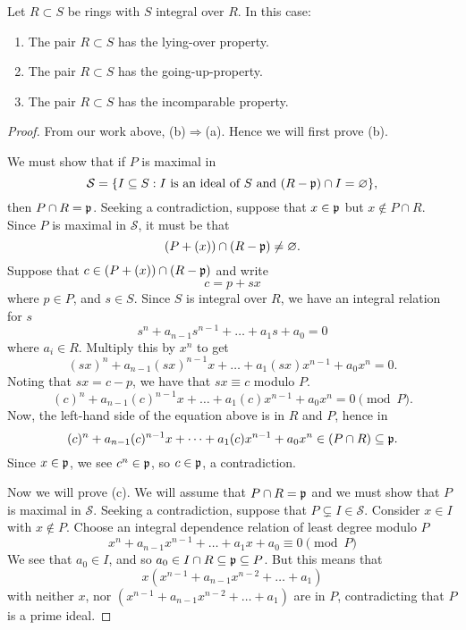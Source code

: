 \documentclass{ximera}
\begin{document}
\begin{theorem}[Going-up]
  Let $R\subset S$ be rings with $S$ integral over $R$. In this case:
  \begin{enumerate}
  \item The pair $R\subset S$ has the lying-over property.
  \item The pair $R\subset S$ has the going-up-property.
  \item The pair $R\subset S$ has the incomparable property.
  \end{enumerate}
  \begin{proof}
    From our work above, (b)$\Rightarrow$(a). Hence we will first
    prove (b).

    We must show that if $P$ is maximal in
    \[
    \mathcal{S} = \{I\subseteq S: \text{$I$ is an ideal of $S$ and
      $(R-\mathfrak{p})\cap I = \varnothing$}\},
    \]
    then $P\cap R = \mathfrak{p}$. Seeking a contradiction, suppose that
    $x\in\mathfrak{p}$ but $x\notin P\cap R$. Since $P$ is maximal in
    $\mathcal{S}$, it must be that
    \[
    (P + (x)) \cap (R-\mathfrak{p}) \ne \varnothing.
    \]
    Suppose that $c\in (P + (x)) \cap (R-\mathfrak{p})$ and write
    \[
    c = p + sx
    \]
    where $p\in P$, and $s\in S$. Since $S$ is integral over $R$, we
    have an integral relation for $s$
    \[
    s^n + a_{n-1}s^{n-1} + \dots + a_1 s + a_0 = 0
    \]
    where $a_i\in R$. Multiply this by $x^n$ to get
    \[
    (sx)^n + a_{n-1}(sx)^{n-1}x + \dots + a_1 (sx)x^{n-1} + a_0x^n = 0.
    \]
    Noting that $sx = c-p$, we have that $sx\equiv c$ modulo $P$.
    \[
    (c)^n + a_{n-1}(c)^{n-1}x + \dots + a_1 (c)x^{n-1} + a_0x^n = 0 \pmod{P}.
    \]
    Now, the left-hand side of the equation above is in $R$ and $P$,
    hence in
    \[
    (c)^n + a_{n-1}(c)^{n-1}x + \dots + a_1 (c)x^{n-1} + a_0x^n \in (P\cap R)\subseteq\mathfrak{p}. 
    \]
    Since $x\in\mathfrak{p}$, we see $c^n\in\mathfrak{p}$, so $c\in\mathfrak{p}$, a contradiction.


    Now we will prove (c). We will assume that $P\cap R = \mathfrak{p}$ and we
    must show that $P$ is maximal in $\mathcal{S}$. Seeking a
    contradiction, suppose that $P\subsetneq
    I\in\mathcal{S}$. Consider $x\in I$ with $x\notin P$. Choose an
    integral dependence relation of least degree modulo $P$
    \[
    x^n + a_{n-1}x^{n-1} + \dots + a_1 x + a_0 \equiv 0 \pmod{P}
    \]
    We see that $a_0\in I$, and so $a_0\in I \cap R \subseteq \mathfrak{p} \subseteq P$. But this means that
    \[
    x(x^{n-1} + a_{n-1}x^{n-2} + \dots + a_1)
    \]
    with neither $x$, nor $(x^{n-1} + a_{n-1}x^{n-2} + \dots + a_1)$
    are in $P$, contradicting that $P$ is a prime ideal.
  \end{proof}
\end{theorem}
\end{document}
